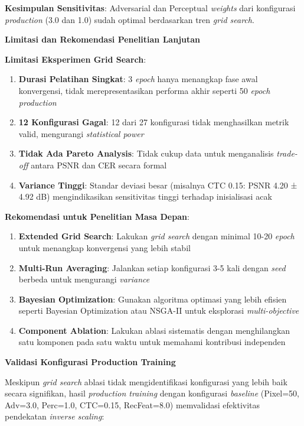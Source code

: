 \documentclass[12pt,a4paper]{article}
\begin{document}
\textbf{Kesimpulan Sensitivitas}: Adversarial dan Perceptual \textit{weights} dari konfigurasi \textit{production} (3.0 dan 1.0) sudah optimal berdasarkan tren \textit{grid search}.

\textbf{Limitasi dan Rekomendasi Penelitian Lanjutan}

\textbf{Limitasi Eksperimen Grid Search}:
\begin{enumerate}[leftmargin=*]
    \item \textbf{Durasi Pelatihan Singkat}: 3 \textit{epoch} hanya menangkap fase awal konvergensi, tidak merepresentasikan performa akhir seperti 50 \textit{epoch} \textit{production}
    \item \textbf{12 Konfigurasi Gagal}: 12 dari 27 konfigurasi tidak menghasilkan metrik valid, mengurangi \textit{statistical power}
    \item \textbf{Tidak Ada Pareto Analysis}: Tidak cukup data untuk menganalisis \textit{trade-off} antara PSNR dan CER secara formal
    \item \textbf{Variance Tinggi}: Standar deviasi besar (misalnya CTC 0.15: PSNR 4.20 ± 4.92 dB) mengindikasikan sensitivitas tinggi terhadap inisialisasi acak
\end{enumerate}

\textbf{Rekomendasi untuk Penelitian Masa Depan}:
\begin{enumerate}[leftmargin=*]
    \item \textbf{Extended Grid Search}: Lakukan \textit{grid search} dengan minimal 10-20 \textit{epoch} untuk menangkap konvergensi yang lebih stabil
    \item \textbf{Multi-Run Averaging}: Jalankan setiap konfigurasi 3-5 kali dengan \textit{seed} berbeda untuk mengurangi \textit{variance}
    \item \textbf{Bayesian Optimization}: Gunakan algoritma optimasi yang lebih efisien seperti Bayesian Optimization atau NSGA-II untuk eksplorasi \textit{multi-objective}
    \item \textbf{Component Ablation}: Lakukan ablasi sistematis dengan menghilangkan satu komponen pada satu waktu untuk memahami kontribusi independen
\end{enumerate}

\textbf{Validasi Konfigurasi Production Training}

Meskipun \textit{grid search} ablasi tidak mengidentifikasi konfigurasi yang lebih baik secara signifikan, hasil \textit{production training} dengan konfigurasi \textit{baseline} (Pixel=50, Adv=3.0, Perc=1.0, CTC=0.15, RecFeat=8.0) memvalidasi efektivitas pendekatan \textit{inverse scaling}:
\end{document}
